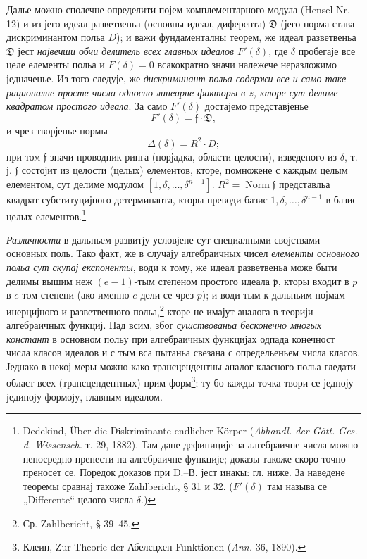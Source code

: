 ﻿\documentclass[11pt]{article}
\providecommand{\frD}{\mathfrak D}
\providecommand{\frf}{\mathfrak f}
\providecommand{\frp}{\mathfrak p}
\begin{document}
Далье можно сполечне определити појем комплементарного модула (Hensel Nr. 12) и из јего идеал разветвеньа (основны идеал, диферента) \(\frD\) (јего норма става дискриминантом польа \(D\)); и важи фундаменталны теорем, же идеал разветвеньа \(\frD\) јест {\itshape највечши обчи делитель всех главных идеалов \(F'(\delta)\)}, где \(\delta\) пробегаје все целе елементы польа и \(F(\delta)=0\) всакократно значи належече неразложимо једначенье. Из того следује, же {\itshape дискриминант польа содержи все и само таке рационалне просте числа односно линеарне факторы в \(z\), кторе сут делиме квадратом простого идеала}. За само \(F'(\delta)\) достајемо представјенье
\[
F'(\delta)=\frf\cdot\frD,
\]
и чрез творјенье нормы
\[
\Delta(\delta)=R^2\cdot D;
\]
при том \(\frf\) значи проводник ринга (порјадка, области целости), изведеного из \(\delta\), т. ј. \(\frf\) состојит из целости (целых) елементов, кторе, помножене с каждым целым елементом, сут делиме модулом \([1,\delta,\ldots,\delta^{n-1}]\). \(R^2=\operatorname{Norm}\frf\) представльа квадрат субституцијного детерминанта, кторы преводи базис \(1,\delta,\ldots,\delta^{n-1}\) в базис целых елементов.\footnote{Dedekind, Über die Diskriminante endlicher Körper (\emph{Abhandl. der Gött. Ges. d. Wissensch.} т. 29, 1882). Там дане дефиниције за алгебраичне числа можно непосредно пренести на алгебраичне функције; доказы такоже скоро точно преносет се. Поредок доказов при D.--В. јест инакы: гл. ниже. За наведене теоремы сравнај такоже Zahlbericht, § 31 и 32. (\(F'(\delta)\) там называ се „Differente“ целого числа \(\delta\).)}

{\itshape Различности} в дальньем развитју условјене сут специалными својствами основных поль. Тако факт, же в случају алгебраичных чисел {\itshape елементы основного польа сут скупај експоненты}, води к тому, же идеал разветвеньа може быти делимы вышим неж \((e-1)\)-тым степеном простого идеала \(\frp\), кторы входит в \(p\) в \(e\)-том степени (ако именно \(e\) дели се чрез \(p\)); и води тым к дальньим појмам инерцијного и разветвенного польа,\footnote{Ср. Zahlbericht, § 39--45.} кторе не имајут аналога в теорији алгебраичных функциј. Над всим, због {\itshape сушствованьа бесконечно многых констант} в основном польу при алгебраичных функцијах одпада конечност числа класов идеалов и с тым вса пытаньа свезана с определьеньем числа класов. Једнако в некој меры можно како трансцендентны аналог класного польа гледати област всех (трансцендентных) прим-форм\footnote{Клеин, Zur Theorie der Абелсцхен Funktionen (\emph{Ann.} 36, 1890).}; ту бо кажды точка твори се једноју јединоју формоју, главным идеалом.
\end{document}
